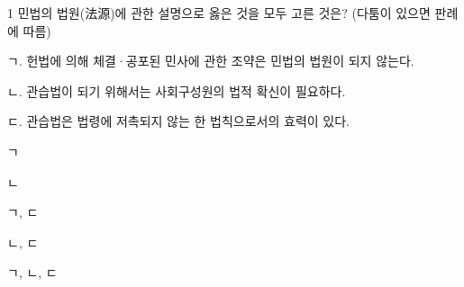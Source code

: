 \begin{question}{1}
민법의 법원(法源)에 관한 설명으로 옳은 것을 모두 고른 것은? (다툼이 있으면 판례에 따름)
\begin{framedtext}
ㄱ. 헌법에 의해 체결·공포된 민사에 관한 조약은 민법의 법원이 되지 않는다. \par
ㄴ. 관습법이 되기 위해서는 사회구성원의 법적 확신이 필요하다. \par
ㄷ. 관습법은 법령에 저촉되지 않는 한 법칙으로서의 효력이 있다.
\end{framedtext}
\begin{choices}
  \item ㄱ
  \item ㄴ
  \item ㄱ, ㄷ
  \item ㄴ, ㄷ
  \item ㄱ, ㄴ, ㄷ
\end{choices}
\end{question}

